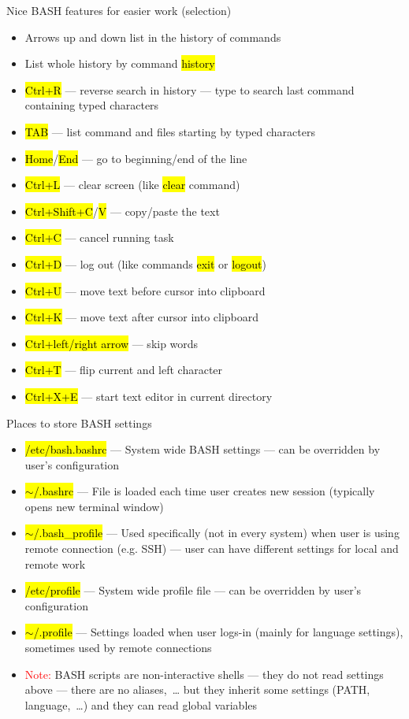 \documentclass[compress, ucs, xelatex, 11pt, xcolor=svgnames, aspectratio=169,
	hyperref={
		bookmarks=true,
		unicode=true,
		colorlinks=true,
		pdftitle={Linux, command line and MetaCentrum},
		plainpages=false,
		pdfauthor={Vojtech Zeisek},
		pdfsubject={Course about use of Linux command line, writing shell scripts and using MetaCentrum of CESNET},
		pdfcreator={XeLaTeX},
		pdfkeywords={Linux, GNU, BASH, shell, command line, MetaCentrum},
		linkcolor=DarkRed, %
		anchorcolor=DarkBlue, %
		citecolor=Indigo, %
		filecolor=NavyBlue, %
		menucolor=DarkMagenta, %
		urlcolor=DarkBlue, %
		pdftex},
	url={hyphens, lowtilde} %
	]{beamer}
\renewcommand{\texttt}[1]{\hl{\ttfamily #1}}
\renewcommand{\alert}[1]{\textcolor{red}{#1}}
\begin{document}
\begin{frame}{Nice BASH features for easier work (selection)}
	\begin{itemize}
		\item Arrows up and down list in the history of commands
		\item List whole history by command \texttt{history}
		\item \texttt{Ctrl+R} --- reverse search in history --- type to search last command containing typed characters
		\item \texttt{TAB} --- list command and files starting by typed characters
		\item \texttt{Home}/\texttt{End} --- go to beginning/end of the line
		\item \texttt{Ctrl+L} --- clear screen (like \texttt{clear} command)
		\item \texttt{Ctrl+Shift+C}/\texttt{V} --- copy/paste the text
		\item \texttt{Ctrl+C} --- cancel running task
		\item \texttt{Ctrl+D} --- log out (like commands \texttt{exit} or \texttt{logout})
		\item \texttt{Ctrl+U} --- move text before cursor into clipboard
		\item \texttt{Ctrl+K} --- move text after cursor into clipboard
		\item \texttt{Ctrl+left/right arrow} --- skip words
		\item \texttt{Ctrl+T} --- flip current and left character
		\item \texttt{Ctrl+X+E} --- start text editor in current directory
	\end{itemize}
\end{frame}

\begin{frame}{Places to store BASH settings}
	\begin{itemize}
		\item \texttt{/etc/bash.bashrc} --- System wide BASH settings --- can be overridden by user's configuration
		\item \texttt{$\sim$/.bashrc} --- File is loaded each time user creates new session (typically opens new terminal window)
		\item \texttt{$\sim$/.bash\_profile} --- Used specifically (not in every system) when user is using remote connection (e.g. SSH) --- user can have different settings for local and remote work
		\item \texttt{/etc/profile} --- System wide profile file --- can be overridden by user's configuration
		\item \texttt{$\sim$/.profile} --- Settings loaded when user logs-in (mainly for language settings), sometimes used by remote connections
		\item \alert{Note:} BASH scripts are non-interactive shells --- they do not read settings above --- there are no aliases,~\ldots{ }but they inherit some settings (PATH, language,~\ldots) and they can read global variables
	\end{itemize}
\end{frame}
\end{document}
